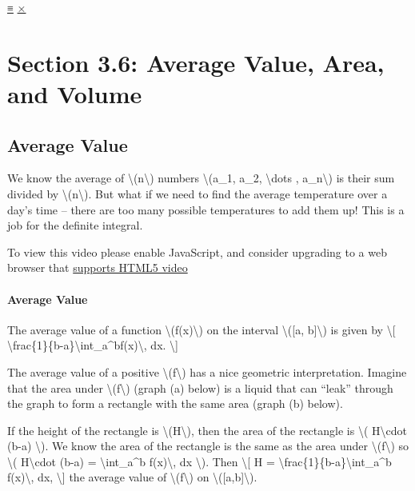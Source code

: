 \protect\hyperlink{main-nav}{≡} \protect\hyperlink{close-nav}{×}

\hypertarget{section-3.6-average-value-area-and-volume}{%
\section{Section 3.6: Average Value, Area, and
Volume}\label{section-3.6-average-value-area-and-volume}}

\hypertarget{average-value}{%
\subsection{Average Value}\label{average-value}}

We know the average of \textbackslash{}(n\textbackslash{}) numbers
\textbackslash{}(a\_1, a\_2, \textbackslash{}dots ,
a\_n\textbackslash{}) is their sum divided by
\textbackslash{}(n\textbackslash{}). But what if we need to find the
average temperature over a day's time -- there are too many possible
temperatures to add them up! This is a job for the definite integral.

To view this video please enable JavaScript, and consider upgrading to a
web browser that \href{http://videojs.com/html5-video-support/}{supports
HTML5 video}

\hypertarget{average-value-1}{%
\paragraph{Average Value}\label{average-value-1}}

The average value of a function \textbackslash{}(f(x)\textbackslash{})
on the interval \textbackslash{}({[}a, b{]}\textbackslash{}) is given by
\textbackslash{}{[}
\textbackslash{}frac\{1\}\{b-a\}\textbackslash{}int\_a\^{}bf(x)\textbackslash{},
dx. \textbackslash{}{]}

The average value of a positive \textbackslash{}(f\textbackslash{}) has
a nice geometric interpretation. Imagine that the area under
\textbackslash{}(f\textbackslash{}) (graph (a) below) is a liquid that
can ``leak'' through the graph to form a rectangle with the same area
(graph (b) below).

If the height of the rectangle is \textbackslash{}(H\textbackslash{}),
then the area of the rectangle is \textbackslash{}(
H\textbackslash{}cdot (b-a) \textbackslash{}). We know the area of the
rectangle is the same as the area under
\textbackslash{}(f\textbackslash{}) so \textbackslash{}(
H\textbackslash{}cdot (b-a) = \textbackslash{}int\_a\^{}b
f(x)\textbackslash{}, dx \textbackslash{}). Then \textbackslash{}{[} H =
\textbackslash{}frac\{1\}\{b-a\}\textbackslash{}int\_a\^{}b
f(x)\textbackslash{}, dx, \textbackslash{}{]} the average value of
\textbackslash{}(f\textbackslash{}) on
\textbackslash{}({[}a,b{]}\textbackslash{}).

